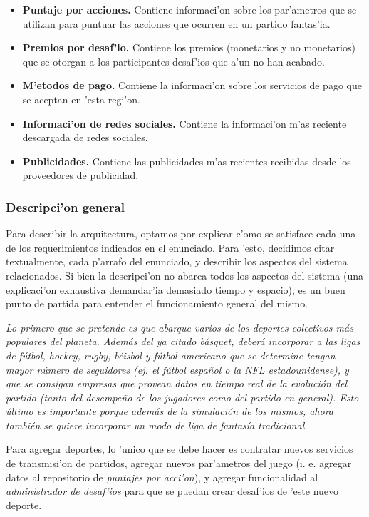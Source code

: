 \begin{itemize}
	\item \textbf{Puntaje por acciones.} Contiene informaci'on sobre los par'ametros que se utilizan para puntuar las acciones que ocurren en un partido fantas'ia.
	\item \textbf{Premios por desaf'io.} Contiene los premios (monetarios y no monetarios) que se otorgan a los participantes desaf'ios que a'un no han acabado.
	\item \textbf{M'etodos de pago.} Contiene la informaci'on sobre los servicios de pago que se aceptan en 'esta regi'on.
	\item \textbf{Informaci'on de redes sociales.} Contiene la informaci'on m'as reciente descargada de redes sociales.
	\item \textbf{Publicidades.} Contiene las publicidades m'as recientes recibidas desde los proveedores de publicidad.
\end{itemize}

\subsubsection{Descripci'on general}

Para describir la arquitectura, optamos por explicar c'omo se satisface cada una de los requerimientos indicados en el enunciado. Para 'esto, decidimos citar textualmente, cada p'arrafo del enunciado, y describir los aspectos del sistema relacionados. Si bien la descripci'on no abarca todos los aspectos del sistema (una explicaci'on exhaustiva demandar'ia demasiado tiempo y espacio), es un buen punto de partida para entender el funcionamiento general del mismo.

\textit{Lo primero que se pretende es que abarque varios de los deportes colectivos más populares del planeta. Además del ya citado básquet, deberá incorporar a las ligas de fútbol, hockey, rugby, béisbol y fútbol americano que se determine tengan mayor número de seguidores (ej. el fútbol español o la NFL estadounidense), y que se consigan empresas que provean datos en tiempo real de la evolución del partido (tanto del desempeño de los jugadores como del partido en general). Esto último es importante porque además de la simulación de los mismos, ahora también se quiere incorporar un modo de liga de fantasía tradicional.}

Para agregar deportes, lo 'unico que se debe hacer es contratar nuevos servicios de transmisi'on de partidos, agregar nuevos par'ametros del juego (i. e. agregar datos al repositorio de \textit{puntajes por acci'on}), y agregar funcionalidad al \textit{administrador de desaf'ios} para que se puedan crear desaf'ios de 'este nuevo deporte.

